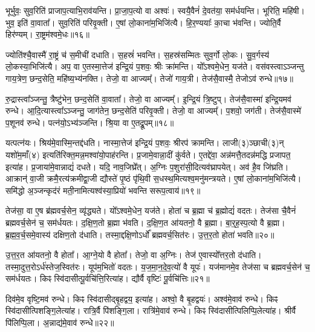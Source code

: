भूर्भुवः॒ सुव॒रिति॑ प्राजाप॒त्याभि॒राव॑यन्ति।
प्रा॒जा॒प॒त्यो वा अश्वः॑।
स्वयै॒वैनं॑ दे॒वत॑या॒ सम॑र्धयन्ति।
भूरिति॒ महि॑षी।
भुव॒ इति॑ वा॒वाता᳚।
सुव॒रिति॑ परिवृ॒क्ती।
ए॒षां लो॒काना॑म॒भिजि॑त्यै।
हि॒र॒ण्ययाः᳚ का॒चा भ॑वन्ति।
ज्योति॒र्वै हिर॑ण्यम्।
रा॒ष्ट्रम॑श्वमे॒धः॥१६॥\ip

ज्योति॑श्चै॒वास्मै॑ रा॒ष्ट्रं च॑ स॒मीची॑ दधाति।
स॒हस्रं॑ भवन्ति।
स॒हस्र॑सम्मितः सुव॒र्गो लो॒कः।
सु॒व॒र्गस्य॑ लो॒कस्या॒भिजि॑त्यै।
अप॒ वा ए॒तस्मा॒त्तेज॑ इन्द्रि॒यं प॒शवः॒ श्रीः क्रा॑मन्ति।
यो᳚ऽश्वमे॒धेन॒ यज॑ते।
वस॑वस्त्वा\-ऽञ्जन्तु गाय॒त्रेण॒ छन्द॒सेति॒ महि॑ष्य॒भ्य॑नक्ति।
तेजो॒ वा आज्यम्᳚।
तेजो॑ गाय॒त्री।
तेज॑सै॒वास्मै॒ तेजो\-ऽव॑ रुन्धे॥१७॥\ip

रु॒द्रास्त्वा᳚ञ्जन्तु॒ त्रैष्टु॑भेन॒ छन्द॒सेति॑ वा॒वाता᳚।
तेजो॒ वा आज्यम्᳚।
इ॒न्द्रि॒यं त्रि॒ष्टुप्।
तेज॑सै॒वास्मा॑ इन्द्रि॒यमव॑ रुन्धे।
आ॒दि॒त्यास्त्वा᳚\-ऽञ्जन्तु॒ जाग॑तेन॒ छन्द॒सेति॑ परिवृ॒क्ती।
तेजो॒ वा आज्यम्᳚।
प॒शवो॒ जग॑ती।
तेज॑सै॒वास्मे॑ प॒शूनव॑ रुन्धे।
पत्न॑यो॒\-ऽभ्य॑ञ्जन्ति।
श्रि॒या वा ए॒तद्रू॒पम्॥१८॥\ip

यत्पत्न॑यः।
श्रिय॑मे॒वास्मि॒न्तद्द॑धति।
नास्मा॒त्तेज॑ इन्द्रि॒यं प॒शवः॒ श्रीरप॑ क्रामन्ति।
लाजी(३)ञ्छाची(३)न् यशो॑म॒माँ(४) इत्यति॑रिक्त॒मन्न॒मश्वा॑यो॒पाह॑रन्ति।
प्र॒जामे॒वान्ना॒दीं कु॑र्वते।
ए॒तद्दे॑वा॒ अन्न॑मत्तै॒तदन्न॑मद्धि प्रजापत॒ इत्या॑ह।
प्र॒जाया॑मे॒वान्नाद्यं॑ दधते।
यदि॒ नाव॒जिघ्रे᳚त्।
अ॒ग्निः प॒शुरा॑सी॒दित्यव॑घ्रापयेत्।
अव॑ है॒व जि॑घ्रति।
आक्रान्॑ वा॒जी क्रमै॒रत्य॑क्रमीद्वा॒जी द्यौस्ते॑ पृ॒ष्ठं पृ॑थि॒वी स॒धस्थ॒मित्यश्व॒मनु॑मन्त्रयते।
ए॒षां लो॒काना॑म॒भिजि॑त्यै।
समि॑द्धो अ॒ञ्जन्कृद॑रं मती॒नामित्यश्व॑स्या॒प्रियो॑ भवन्ति सरूप॒त्वाय॑॥१९॥\ip\anuvakamend[परि॑त॒स्थुष॒ इत्या॑हे॒मे ए॒वास्मै॑ युनक्त्य॒भिजि॑त्यै भरन्त्यश्वमे॒धो रु॑न्धे रू॒पञ्जि॑घ्रति॒ त्रीणि॑ च]

तेज॑सा॒ वा ए॒ष ब्र॑ह्म\-वर्च॒सेन॒ व्यृ॑द्ध्यते।
यो᳚ऽश्वमे॒धेन॒ यज॑ते।
होता॑ च ब्र॒ह्मा च॑ ब्र॒ह्मोद्यं॑ वदतः।
तेज॑सा चै॒वैनं॑ ब्रह्मवर्च॒सेन॑ च॒ सम॑र्धयतः।
द॒क्षि॒ण॒तो ब्र॒ह्मा भ॑वति।
द॒क्षि॒ण॒त आ॑यतनो॒ वै ब्र॒ह्मा।
बा॒र्॒ह॒स्प॒त्यो वै ब्र॒ह्मा।
ब्र॒ह्म॒व॒र्च॒समे॒वास्य॑ दक्षिण॒तो द॑धाति।
तस्मा॒द्दक्षि॒णो\-ऽर्धो᳚ ब्रह्मवर्च॒सित॑रः।
उ॒त्त॒र॒तो होता॑ भवति॥२०॥\ip

उ॒त्त॒र॒त आ॑यतनो॒ वै होता᳚।
आ॒ग्ने॒यो वै होता᳚।
तेजो॒ वा अ॒ग्निः।
तेज॑ ए॒वास्यो᳚त्तर॒तो द॑धाति।
तस्मा॒दुत्त॒रो\-ऽर्ध॑स्तेज॒स्वित॑रः।
यूप॑म॒भितो॑ वदतः।
य॒ज॒मा॒न॒दे॒व॒त्यो॑ वै यूपः॑।
यज॑मानमे॒व तेज॑सा च ब्रह्मवर्च॒सेन॑ च॒ सम॑र्धयतः।
किꣴ स्वि॑दासीत्पू॒र्वचि॑त्ति॒रित्या॑ह।
द्यौर्वै वृष्टिः॑ पू॒र्वचि॑त्तिः॥२१॥\ip

दिव॑मे॒व वृष्टि॒मव॑ रुन्धे।
किꣴ स्वि॑दासीद्बृ॒हद्वय॒ इत्या॑ह।
अश्वो॒ वै बृ॒हद्वयः॑।
अश्व॑मे॒वाव॑ रुन्धे।
किꣴ स्वि॑दासीत्पिशङ्गि॒लेत्या॑ह।
रात्रि॒र्वै पि॑शङ्गि॒ला।
रात्रि॑मे॒वाव॑ रुन्धे।
किꣴ स्वि॑दासीत्पिलिप्पि॒ले\-त्या॑ह।
श्रीर्वै पि॑लिप्पि॒ला।
अ॒न्नाद्य॑मे॒वाव॑ रुन्धे॥२२॥\ip

